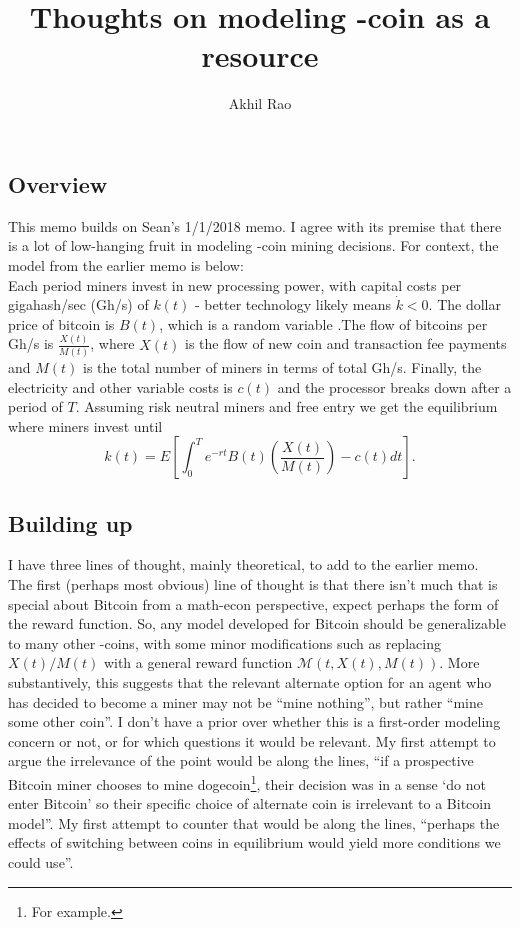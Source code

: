 \documentclass[12pt]{article}
\title{Thoughts on modeling -coin as a resource}
\author{Akhil Rao}
\begin{document}
\maketitle

\subsection*{Overview}

This memo builds on Sean's 1/1/2018 memo. I agree with its premise that there is a lot of low-hanging fruit in modeling -coin mining decisions.  For context, the model from the earlier memo is below: \\

Each period miners invest in new processing power, with capital costs per gigahash/sec (Gh/s) of $k(t)$ - better technology likely means $\dot{k} < 0$. The dollar price of bitcoin is $B(t)$, which is a random variable .The flow of bitcoins per Gh/s is $\frac{X(t)}{M(t)}$, where $X(t)$ is the flow of new coin and transaction fee payments and $M(t)$ is the total number of miners in terms of total Gh/s. Finally, the electricity and other variable costs is $c(t)$ and the processor breaks down after a period of $T$. Assuming risk neutral miners and free entry we get the equilibrium where miners invest until
\begin{equation}
\label{baseline} 
k(t) = E \left [ \int_0^T e^{-rt} B(t) \left ( \frac{X(t)}{M(t)} \right ) - c(t) dt \right ] .
\end{equation}

\subsection*{Building up}

I have three lines of thought, mainly theoretical, to add to the earlier memo. \\

The first (perhaps most obvious) line of thought is that there isn't much that is special about Bitcoin from a math-econ perspective, expect perhaps the form of the reward function. So, any model developed for Bitcoin should be generalizable to many other -coins, with some minor modifications such as replacing $X(t)/M(t)$ with a general reward function $\mathcal{M}(t,X(t),M(t))$. More substantively, this suggests that the relevant alternate option for an agent who has decided to become a miner may not be ``mine nothing'', but rather ``mine some other coin''. I don't have a prior over whether this is a first-order modeling concern or not, or for which questions it would be relevant. My first attempt to argue the irrelevance of the point would be along the lines, ``if a prospective Bitcoin miner chooses to mine dogecoin\footnote{For example.}, their decision was in a sense `do not enter Bitcoin' so their specific choice of alternate coin is irrelevant to a Bitcoin model''. My first attempt to counter that would be along the lines, ``perhaps the effects of switching between coins in equilibrium would yield more conditions we could use''.\\
\end{document}
